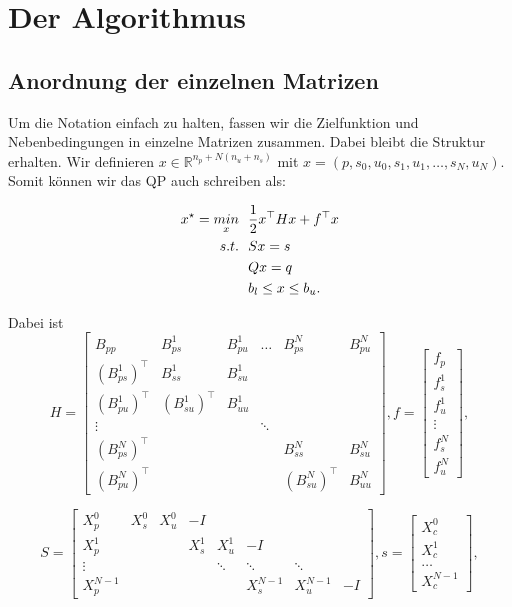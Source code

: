 \section{Der Algorithmus}


\subsection{Anordnung der einzelnen Matrizen}

Um die Notation einfach zu halten, fassen wir die Zielfunktion und Nebenbedingungen in einzelne Matrizen zusammen. Dabei bleibt die Struktur erhalten. Wir definieren $x \in \mathbb{R}^{n_p+N(n_u+n_s)}$ mit $x=(p,s_0,u_0,s_1,u_1,\hdots,s_{N},u_{N})$. Somit können wir das QP auch schreiben als:

\begin{align} \label{qp:std}
x^\star=\underset{x}{min} \ \ 	& \frac{1}{2}	x^\top H x+f^\top x \\
s.t. \ \ 				& Sx=s \notag \\
						& Qx=q \notag \\
						& b_l \leq x \leq b_u. \notag 
\end{align}

Dabei ist $$H= \left[ \begin{array}{cccccc}
B_{pp} & B_{ps}^1 & B_{pu}^1 & \hdots & B_{ps}^{N} & B_{pu}^{N} \\ 
(B_{ps}^1)^\top & B_{ss}^1 & B_{su}^1 &  &  & \\ 
(B_{pu}^1)^\top & (B_{su}^1)^\top & B_{uu}^1 &  &  &  \\ 
\vdots &  &  & \ddots &  &  \\ 
(B_{ps}^{N})^\top &  &  &  & B_{ss}^{N} & B_{su}^{N} \\ 
(B_{pu}^{N})^\top &  &  &  & (B_{su}^{N})^\top & B_{uu}^{N}
\end{array} \right]  
,f=\left[ \begin{array}{c}
f_p \\ 
f_s^1 \\ 
f_u^1 \\ 
\vdots \\ 
f_s^{N} \\ 
f_u^{N}
\end{array}  \right],$$

$$S=\left[\begin{array}{cccccccc}
X_p^0 & X_s^0 & X_u^0 & - I &  &  &  &  \\ 
X_p^1 &  &  & X_s^1 & X_u ^1  & -I &  &  \\ 
\vdots &  &  &  & \ddots & \ddots & \ddots &  \\ 
X_p^{N-1} &  &  &  &  & X_s^{N-1} & X_u^{N-1} & -I
\end{array}  \right],
s=\left[ \begin{array}{c}
X_c^ 0 \\ 
X_c^1 \\ 
\hdots \\ 
X_c^{N-1}
\end{array} \right], $$

